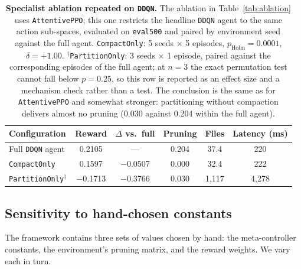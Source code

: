 \documentclass[fleqn,10pt]{wlscirep}
\newcommand{\attentive}{\texttt{AttentivePPO}}
\newcommand{\ddqn}{\texttt{DDQN}}
\begin{document}
\begin{table}[!htbp]
\centering
\begin{tabular}{lccccc}
\toprule
\textbf{Configuration} & \textbf{Reward} & $\Delta$ \textbf{vs.\ full} &
  \textbf{Pruning} & \textbf{Files} & \textbf{Latency (ms)} \\
\midrule
Full \ddqn{} agent      & 0.2105    & ---       & 0.204 & 37.4    & 220 \\
\texttt{CompactOnly}    & 0.1597    & $-$0.0507 & 0.000 & 32.4    & 222 \\
\texttt{PartitionOnly}$^{\dagger}$ & $-$0.1713 & $-$0.3766 & 0.030 & 1{,}117 & 4{,}278 \\
\bottomrule
\end{tabular}
\caption{\label{tab:ablationddqn}\textbf{Specialist ablation repeated on \ddqn{}.}
  The ablation in Table~\ref{tab:ablation} uses \attentive{}; this one
  restricts the headline \ddqn{} agent to the same action sub-spaces,
  evaluated on \texttt{eval500} and paired by environment seed against
  the full agent. \texttt{CompactOnly}: 5 seeds $\times$ 5 episodes,
  $p_{\text{Holm}} = 0.0001$, $\delta = +1.00$.
  $^{\dagger}$\texttt{PartitionOnly}: 3 seeds $\times$ 1 episode, paired
  against the corresponding episodes of the full agent; at $n = 3$ the
  exact permutation test cannot fall below $p = 0.25$, so this row is
  reported as an effect size and a mechanism check rather than a test.
  The conclusion is the same as for \attentive{} and somewhat stronger:
  partitioning without compaction delivers almost no pruning (0.030
  against 0.204 within the full agent).}
\end{table}

\FloatBarrier

\subsection*{Sensitivity to hand-chosen constants}
\label{sec:sensitivity}

The framework contains three sets of values chosen by hand: the
meta-controller constants, the environment's pruning matrix, and the
reward weights. We vary each in turn.
\end{document}
